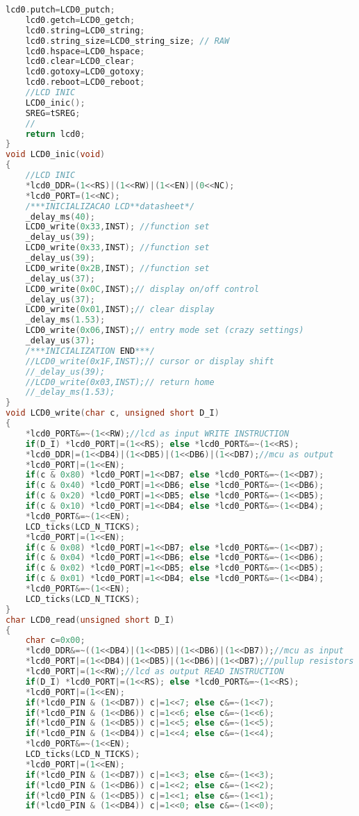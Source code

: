 \begin{lstlisting}[language=C, caption={lcd.c}, label=lcd-c, captionpos=b]
	lcd0.putch=LCD0_putch;
	lcd0.getch=LCD0_getch;
	lcd0.string=LCD0_string;
	lcd0.string_size=LCD0_string_size; // RAW
	lcd0.hspace=LCD0_hspace;
	lcd0.clear=LCD0_clear;
	lcd0.gotoxy=LCD0_gotoxy;
	lcd0.reboot=LCD0_reboot;
	//LCD INIC
	LCD0_inic();
	SREG=tSREG;
	//
	return lcd0;
}
void LCD0_inic(void)
{
	//LCD INIC
	*lcd0_DDR=(1<<RS)|(1<<RW)|(1<<EN)|(0<<NC);
	*lcd0_PORT=(1<<NC);
	/***INICIALIZACAO LCD**datasheet*/
	_delay_ms(40);
	LCD0_write(0x33,INST); //function set
	_delay_us(39);
	LCD0_write(0x33,INST); //function set
	_delay_us(39);
	LCD0_write(0x2B,INST); //function set
	_delay_us(37);
	LCD0_write(0x0C,INST);// display on/off control
	_delay_us(37);
	LCD0_write(0x01,INST);// clear display
	_delay_ms(1.53);
	LCD0_write(0x06,INST);// entry mode set (crazy settings)
	_delay_us(37);
	/***INICIALIZATION END***/
	//LCD0_write(0x1F,INST);// cursor or display shift
	//_delay_us(39);
	//LCD0_write(0x03,INST);// return home
	//_delay_ms(1.53);
}
void LCD0_write(char c, unsigned short D_I)
{
	*lcd0_PORT&=~(1<<RW);//lcd as input WRITE INSTRUCTION
	if(D_I) *lcd0_PORT|=(1<<RS); else *lcd0_PORT&=~(1<<RS);
	*lcd0_DDR|=(1<<DB4)|(1<<DB5)|(1<<DB6)|(1<<DB7);//mcu as output
	*lcd0_PORT|=(1<<EN);
	if(c & 0x80) *lcd0_PORT|=1<<DB7; else *lcd0_PORT&=~(1<<DB7);
	if(c & 0x40) *lcd0_PORT|=1<<DB6; else *lcd0_PORT&=~(1<<DB6);
	if(c & 0x20) *lcd0_PORT|=1<<DB5; else *lcd0_PORT&=~(1<<DB5);
	if(c & 0x10) *lcd0_PORT|=1<<DB4; else *lcd0_PORT&=~(1<<DB4);
	*lcd0_PORT&=~(1<<EN);
	LCD_ticks(LCD_N_TICKS);
	*lcd0_PORT|=(1<<EN);
	if(c & 0x08) *lcd0_PORT|=1<<DB7; else *lcd0_PORT&=~(1<<DB7);
	if(c & 0x04) *lcd0_PORT|=1<<DB6; else *lcd0_PORT&=~(1<<DB6);
	if(c & 0x02) *lcd0_PORT|=1<<DB5; else *lcd0_PORT&=~(1<<DB5);
	if(c & 0x01) *lcd0_PORT|=1<<DB4; else *lcd0_PORT&=~(1<<DB4);
	*lcd0_PORT&=~(1<<EN);
	LCD_ticks(LCD_N_TICKS);
}
char LCD0_read(unsigned short D_I)
{
	char c=0x00;
	*lcd0_DDR&=~((1<<DB4)|(1<<DB5)|(1<<DB6)|(1<<DB7));//mcu as input
	*lcd0_PORT|=(1<<DB4)|(1<<DB5)|(1<<DB6)|(1<<DB7);//pullup resistors
	*lcd0_PORT|=(1<<RW);//lcd as output READ INSTRUCTION
	if(D_I) *lcd0_PORT|=(1<<RS); else *lcd0_PORT&=~(1<<RS);
	*lcd0_PORT|=(1<<EN);
	if(*lcd0_PIN & (1<<DB7)) c|=1<<7; else c&=~(1<<7);
	if(*lcd0_PIN & (1<<DB6)) c|=1<<6; else c&=~(1<<6);
	if(*lcd0_PIN & (1<<DB5)) c|=1<<5; else c&=~(1<<5);
	if(*lcd0_PIN & (1<<DB4)) c|=1<<4; else c&=~(1<<4);
	*lcd0_PORT&=~(1<<EN);
	LCD_ticks(LCD_N_TICKS);
	*lcd0_PORT|=(1<<EN);
	if(*lcd0_PIN & (1<<DB7)) c|=1<<3; else c&=~(1<<3);
	if(*lcd0_PIN & (1<<DB6)) c|=1<<2; else c&=~(1<<2);
	if(*lcd0_PIN & (1<<DB5)) c|=1<<1; else c&=~(1<<1);
	if(*lcd0_PIN & (1<<DB4)) c|=1<<0; else c&=~(1<<0);

\end{lstlisting}
